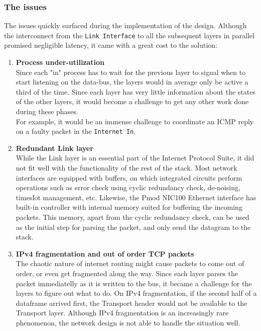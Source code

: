 \subsubsection{The issues}
The issues quickly surfaced during the implementation of the design. Although 
the interconnect from the \texttt{Link Interface} to all the subsequent layers
in parallel promised negligible latency, it came with a great cost to the solution:
\begin{enumerate}

\item \textbf{Process under-utilization} \label{item:process_utilization}\\
Since each "in" process has to wait for the previous layer to signal when to 
start listening on the data-bus, the layers would in average only be active a third
of the time. Since each layer has very little information about the states of 
the other layers, it would become a challenge to get any other work done during
these phases.\\
For example, it would be an immense challenge to coordinate an ICMP reply on a 
faulty packet in the \texttt{Internet In}.

\item \textbf{Redundant Link layer}\\
While the Link layer is an essential part of the Internet Protocol Suite, it did 
not fit well with the functionality of the rest of the stack. 
Most network interfaces are equipped with buffers, on which integrated circuits
perform operations such as error check using cyclic redundancy check, de-noising,
timeslot management, etc. 
Likewise, the Pmod NIC100 Ethernet interface has built-in controller with 
internal memory suited for buffering the incoming packets\cite{microchip_enc424j600}.
This memory, apart from the cyclic redundancy check, can be used as the initial
step for parsing the packet, and only send the datagram to the stack.


\item \textbf{IPv4 fragmentation and out of order TCP packets}\\
The chaotic nature of internet routing might cause packets to come out of order,
or even get fragmented along the way. Since each layer parses the packet immediatelly
as it is written to the bus, it became a challenge for the layers to figure out 
what to do. On IPv4 fragmentation, if the second half of a dataframe arrived 
first, the Transport header would not be available to the Transport layer. 
Although IPv4 fragmentation is an increasingly rare phenomenon, the network 
design is not able to handle the situation well.  


\end{enumerate}
